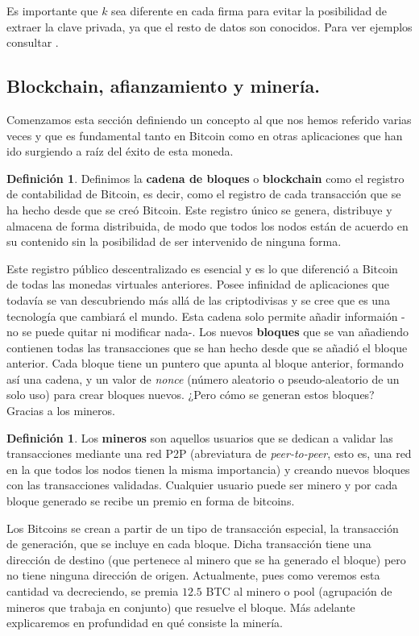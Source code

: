 \documentclass[twoside]{article}
\theoremstyle{definition}
\newtheorem{defi}[teorema]{Definición}
\begin{document}
Es importante que $k$ sea diferente en cada firma para evitar la posibilidad de extraer la clave privada, ya que el resto de datos son conocidos. Para ver ejemplos consultar \cite{Eric}.

\subsection{Blockchain, afianzamiento y minería.}

Comenzamos esta sección definiendo un concepto al que nos hemos referido varias veces y que es fundamental tanto en Bitcoin como en otras aplicaciones que han ido surgiendo a raíz del éxito de esta moneda. 
\begin{defi}
Definimos la \textbf{cadena de bloques} o \textbf{blockchain} como el registro de contabilidad de Bitcoin, es decir, como el registro de cada transacción que se ha hecho desde que se creó Bitcoin. Este registro único se genera, distribuye y almacena de forma distribuida, de modo que todos los nodos están de acuerdo en su contenido sin la posibilidad de ser intervenido de ninguna forma. 
\end{defi}

Este registro público descentralizado es esencial y es lo que diferenció a Bitcoin de todas las monedas virtuales anteriores. Posee infinidad de aplicaciones que todavía se van descubriendo más allá de las criptodivisas y se cree que es una tecnología que cambiará el mundo. Esta cadena solo permite añadir informaión -no se puede quitar ni modificar nada-. Los nuevos \textbf{bloques} que se van añadiendo contienen todas las transacciones que se han hecho desde que se añadió el bloque anterior. Cada bloque tiene un puntero que apunta al bloque anterior, formando así una cadena, y un valor de \textit{nonce} (número aleatorio o pseudo-aleatorio de un solo uso) para crear bloques nuevos. ¿Pero cómo se generan estos bloques? Gracias a los mineros.
\begin{defi}
Los \textbf{mineros} son aquellos usuarios que se dedican a validar las transacciones mediante una red P2P (abreviatura de \emph{peer-to-peer}, esto es, una red en la que todos los nodos tienen la misma importancia) y creando nuevos bloques con las transacciones validadas. Cualquier usuario puede ser minero y por cada bloque generado se recibe un premio en forma de bitcoins. 
\end{defi}
Los Bitcoins se crean a partir de un tipo de transacción especial, la transacción de generación, que se incluye en cada bloque. Dicha transacción tiene una dirección de destino (que pertenece al minero que se ha generado el bloque) pero no tiene ninguna dirección de origen. Actualmente, pues como veremos esta cantidad va decreciendo, se premia $12.5$ BTC al minero o pool (agrupación de mineros que trabaja en conjunto) que resuelve el bloque. Más adelante explicaremos en profundidad en qué consiste la minería.
\end{document}
